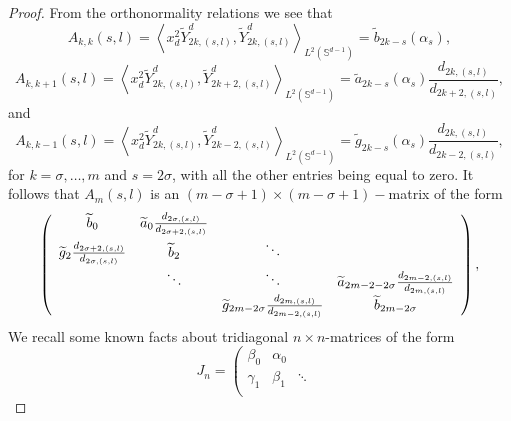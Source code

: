 \documentclass[12pt]{amsart}
\begin{document}
\begin{proof}
From the orthonormality relations we see that 
\begin{equation*}
A_{k,k}\left( s,l\right) =\left\langle x_{d}^{2}\widetilde{Y}^d_{2k,\left(
s,l\right) },\widetilde{Y}^d_{2k,\left( s,l\right) }\right\rangle_{L^2(\mathbb{S}^{d-1})}
=\widetilde{b}_{2k-s}\left( \alpha _{s}\right), 
\end{equation*}
\begin{equation*}
A_{k,k+1}\left( s,l\right) =\left\langle x_{d}^{2}\widetilde{Y}^d_{2k,\left(
s,l\right) },\widetilde{Y}^d_{2k+2,\left( s,l\right) }\right\rangle _{L^2(\mathbb{S}^{d-1})}
=
\widetilde{a}_{2k-s}\left( \alpha _{s}\right) \frac{d_{2k,\left(
s,l\right) }}{d_{2k+2,\left( s,l\right) }},
\end{equation*}
and 
\begin{equation*}
A_{k,k-1}\left( s,l\right) =\left\langle x_{d}^{2}\widetilde{Y}^d_{2k,\left(
s,l\right) },\widetilde{Y}^d_{2k-2,\left( s,l\right) }\right\rangle _{L^2(\mathbb{S}^{d-1})}
=
\widetilde{g}_{2k-s}\left( \alpha _{s}\right) \frac{d_{2k,\left(
s,l\right) }}{d_{2k-2,\left( s,l\right) }},
\end{equation*}
for $k=\sigma ,\dots , m$ and $s=2\sigma$, with all the other entries being equal to zero.  It follows that $
A_{m}\left( s,l\right) $ is an $\left( m-\sigma +1\right) \times \left(
m-\sigma +1\right) -$matrix of the form 
\begin{equation*}
\left( 
\begin{array}{cccc}
\widetilde{b}_{0} & \widetilde{a}_{0}\frac{d_{2\sigma ,\left( s,l\right) }}{%
d_{2\sigma +2,\left( s,l\right) }} &  &  \\ 
\widetilde{g}_{2}\frac{d_{2\sigma +2,\left( s,l\right) }}{d_{2\sigma ,\left(
s,l\right) }} & \widetilde{b}_{2} & \ddots &  \\ 
& \ddots & \ddots & \widetilde{a}_{2m - 2-2\sigma }\frac{d_{2m-2,\left( s,l\right) }}{d_{2m,\left( s,l\right)
}} \\ 
&  & \widetilde{g}_{2m-2\sigma }\frac{
d_{2m,\left( s,l\right) }}{d_{2m-2,\left( s,l\right) }} & \widetilde{b}_{2m-2\sigma }
\end{array}%
\right),
\end{equation*}
  We recall some known facts about tridiagonal $n\times n$-matrices of the form 
\begin{equation*}
J_{n}=\left( 
\begin{array}{cccc}
\beta _{0} & \alpha _{0} &  &  \\ 
\gamma _{1} & \beta _{1} & \ddots &  \\ 

\end{array}
\end{equation*}
\end{proof}
\end{document}
